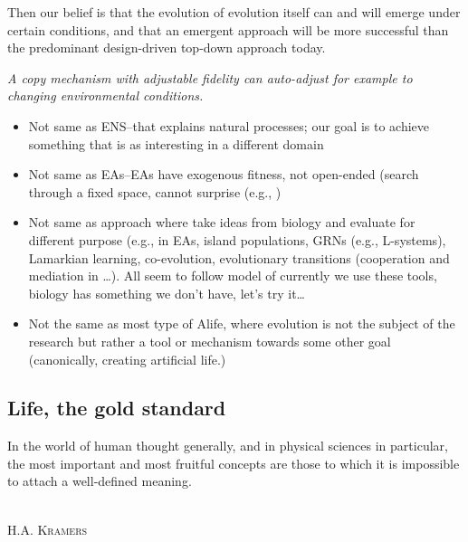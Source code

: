 Then our belief is that the evolution of evolution itself can and will emerge under certain conditions, and that an emergent approach will be more successful than the predominant design-driven top-down approach today.


\emph{A copy mechanism with adjustable fidelity can auto-adjust for example to changing environmental conditions.}

\begin{itemize}
	\item
	      Not same as ENS--that explains natural processes; our goal is to achieve something that is as interesting in a different domain
	\item 
	      Not same as EAs--EAs have exogenous fitness, not open-ended (search through a fixed space, cannot surprise (e.g., \autocite{Nellis2014})
	\item  
	      Not same as approach where take ideas from biology and evaluate for different purpose (e.g., in EAs, island populations, GRNs (e.g., L-systems), Lamarkian learning, co-evolution, evolutionary transitions (cooperation and mediation in \autocite{Defaweux:2005fk}\ldots{}). All seem to follow model of currently we use these tools, biology has something we don't have, let's try it\ldots{}
	\item
	      Not the same as most type of Alife, where evolution is not the subject of the research but rather a tool or mechanism towards some other goal (canonically, creating artificial life.)
\end{itemize}

\subsection{Life, the gold standard}

\epigraph{%
In the world of human thought generally, and in physical sciences in particular, the most important and most fruitful concepts are those to which it is impossible to attach a well-defined meaning.}%
{\textsc{\\H.A. Kramers}}


